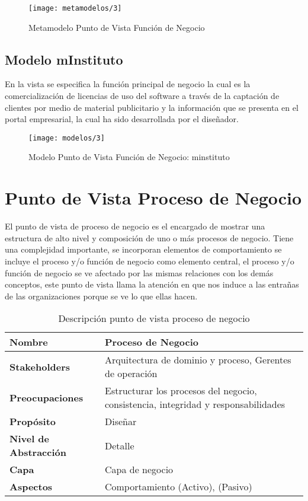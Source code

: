    \begin{figure}[H]
   	\centering
   	\texttt{[image: metamodelos/3]}
   	\captionsetup{width=.95\textwidth}
   	\caption{Metamodelo Punto de Vista Función de Negocio}
   	\label{metamodelo3}
   \end{figure}
    
    \subsection{Modelo mInstituto}
    En la vista se especifica la función principal de negocio la cual es la comercialización de licencias de uso del software a través de la captación de clientes por medio de material publicitario y la información que se presenta en el portal empresarial, la cual ha sido desarrollada por el diseñador.
    
    \begin{figure}[H]
    	\centering
    	\texttt{[image: modelos/3]}
    	\captionsetup{width=.95\textwidth}
    	\caption{Modelo Punto de Vista Función de Negocio: minstituto}
    	\label{modelo3}
    \end{figure}

  \section{Punto de Vista Proceso de Negocio}
  El punto de vista de proceso de negocio es el encargado de mostrar una estructura de alto nivel y composición de uno o más procesos de negocio. Tiene una complejidad importante, se incorporan elementos de comportamiento se incluye el proceso y/o función de negocio como elemento central, el proceso y/o función de negocio se ve afectado por las mismas relaciones con los demás conceptos, este punto de vista llama la atención en que nos induce a las entrañas de las organizaciones porque se ve lo que ellas hacen.
  
  \begin{table}[H]
  	\centering
  	\begin{tabular}{p{3.7cm}p{8cm}}
  		\hline
  		\rowcolor[HTML]{0073a1}
  		{\color[HTML]{FFFFFF} \textbf{Nombre}} & {\color[HTML]{FFFFFF} \textbf{Proceso de Negocio}} \\
  		\hline
  		\textbf{Stakeholders} & Arquitectura de dominio y proceso, Gerentes de operación \\
  		\textbf{Preocupaciones} & Estructurar los procesos del negocio, consistencia, integridad y responsabilidades \\
  		\textbf{Propósito} & Diseñar \\
  		\textbf{Nivel de Abstracción} & Detalle \\
  		\textbf{Capa} & Capa de negocio \\
  		\textbf{Aspectos} & Comportamiento (Activo), (Pasivo) \\
  		\bottomrule
  	\end{tabular}
  	\captionsetup{width=.95\textwidth}
  	\caption{Descripción punto de vista proceso de negocio}
  	\label{Tab:tabla7}
  \end{table}
  
